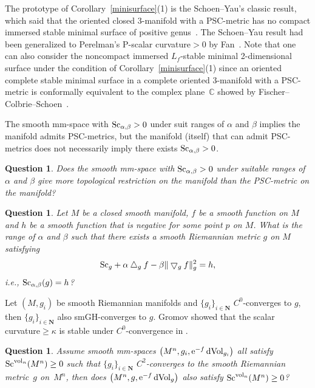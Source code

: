 \documentclass[10pt,a4paper]{amsart}
\newtheorem{Question}[Theorem]{Question}
\begin{document}
\begin{Remark}The prototype of Corollary~\ref{minisurface}(1) is the Schoen--Yau's classic result, which said that the oriented closed 3-manifold with a PSC-metric has no compact immersed stable minimal surface of positive genus~\cite{MR541332}. The Schoen--Yau result had been generalized to Perelman's P-scalar curvature${}>0$ by Fan~\cite{MR2407091}. Note that one can also consider the noncompact immersed $L_f$-stable minimal 2-dimensional surface under the condition of Corollary~\ref{minisurface}(1) since an oriented complete stable minimal surface in a complete oriented 3-manifold with a PSC-metric is conformally equivalent to the complex plane~$\mathbb{C}$ showed by Fischer--Colbrie--Schoen~\cite{MR562550}.
\end{Remark}

The smooth mm-space with ${\rm Sc}_{\alpha, \beta}>0$ under suit ranges of $\alpha$ and $\beta$ implies the manifold admits PSC-metrics, but the manifold (itself) that can admit PSC-metrics does not necessarily imply there exists ${\rm Sc}_{\alpha, \beta}>0$.
\begin{Question}Does the smooth mm-space with ${\rm Sc}_{\alpha, \beta}>0$ under suitable ranges of $\alpha$ and $\beta$ give more topological restriction on the manifold than the PSC-metric on the manifold?
\end{Question}

\begin{Question}Let $M$ be a closed smooth manifold, $f$ be a smooth function on $M$ and $h$ be a smooth function that is negative for some point $p$ on $M$. What is the range of $\alpha$ and $\beta$ such that there exists a smooth Riemannian metric $g$ on $M$ satisfying
 \begin{gather*}
 {\rm Sc}_g + \alpha\bigtriangleup_gf - \beta\|\bigtriangledown_gf\|_g^2=h,
 \end{gather*}
 i.e., ${\rm Sc}_{\alpha, \beta}(g)=h$?
\end{Question}

Let $(M, g_i)$ be smooth Riemannian manifolds and $\{g_i\}_{i\in \mathbf{N}}$ $C^0$-converges to $g$, then $\{g_i\}_{i\in \mathbf{N}}$ also smGH-converges to $g$. Gromov showed that the scalar curvature$\geq \kappa$ is stable under $C^0$-convergence in \cite[Section~1.8]{MR3201312}.

\begin{Question}Assume smooth mm-spaces $\big(M^n,g_i, {\rm e}^{-f}\,{\rm dVol}_{g_i}\big)$ all satisfy ${\rm Sc}^{{\rm vol}_n}(M^n)\geq 0$ such that $\{g_i\}_{i\in \mathbf{N}}$ $C^2$-converges to the smooth Riemannian metric~$g$ on~$M^n$, then does $\big(M^n,g, \allowbreak{\rm e}^{-f}\,{\rm dVol}_{g}\big)$ also satisfy ${\rm Sc}^{{\rm vol}_n}(M^n)\geq 0$?
\end{Question}
\end{document}
